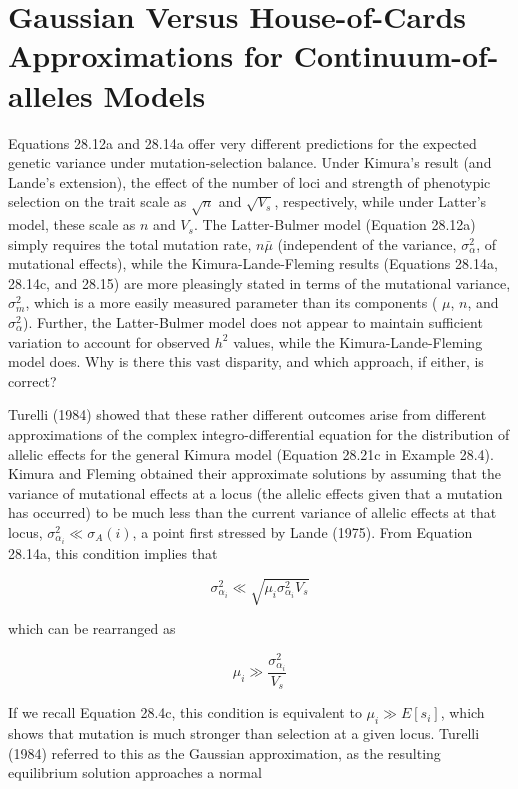 \documentclass{article}
\begin{document}
\section{Gaussian Versus House-of-Cards Approximations for Continuum-of-alleles Models}
Equations 28.12a and 28.14a offer very different predictions for the expected genetic variance under mutation-selection balance. Under Kimura's result (and Lande's extension), the effect of the number of loci and strength of phenotypic selection on the trait scale as  $ \sqrt{n} $ and  $ \sqrt{V_s} $, respectively, while under Latter's model, these scale as  $ n $ and  $ V_s $. The Latter-Bulmer model (Equation 28.12a) simply requires the total mutation rate,  $ n\bar{\mu} $ (independent of the variance,  $ \sigma_\alpha^2 $, of mutational effects), while the Kimura-Lande-Fleming results (Equations 28.14a, 28.14c, and 28.15) are more pleasingly stated in terms of the mutational variance,  $ \sigma_m^2 $, which is a more easily measured parameter than its components ( $ \mu $,  $ n $, and  $ \sigma_\alpha^2 $). Further, the Latter-Bulmer model does not appear to maintain sufficient variation to account for observed  $ h^2 $ values, while the Kimura-Lande-Fleming model does. Why is there this vast disparity, and which approach, if either, is correct?

Turelli (1984) showed that these rather different outcomes arise from different approximations of the complex integro-differential equation for the distribution of allelic effects for the general Kimura model (Equation 28.21c in Example 28.4). Kimura and Fleming obtained their approximate solutions by assuming that the variance of mutational effects at a locus (the allelic effects given that a mutation has occurred) to be much less than the current variance of allelic effects at that locus,  $ \sigma_{\alpha_i}^2 \ll \sigma_A(i) $, a point first stressed by Lande (1975). From Equation 28.14a, this condition implies that

\begin{equation}
\sigma_{\alpha_{i}}^{2}\ll\sqrt{\mu_{i}\sigma_{\alpha_{i}}^{2}V_{s}}
\tag{28.16a}
\label{eq:28_16a}
\end{equation}

which can be rearranged as

\begin{equation}
\mu_{i}\gg\frac{\sigma_{\alpha_{i}}^{2}}{V_{s}}
\tag{28.16b}
\label{eq:28_16b}
\end{equation}

If we recall Equation 28.4c, this condition is equivalent to  $ \mu_i \gg E[s_i] $, which shows that mutation is much stronger than selection at a given locus. Turelli (1984) referred to this as the Gaussian approximation, as the resulting equilibrium solution approaches a normal
\end{document}
